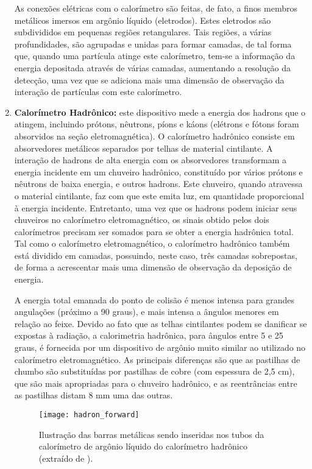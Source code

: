 \begin{enumerate}
As conexões elétricas com o calorímetro são feitas, de fato, a finos membros metálicos imersos em argônio líquido (eletrodos). Estes eletrodos são subdivididos em pequenas regiões retangulares. Tais regiões, a várias profundidades, são agrupadas e unidas para formar camadas, de tal forma que, quando uma partícula atinge este calorímetro, tem-se a informação da energia depositada através de várias camadas, aumentando a resolução da detecção, uma vez que se adiciona mais uma dimensão de observação da interação de partículas com este calorímetro.

\item \textbf{Calorímetro Hadrônico:} este dispositivo mede a energia dos hadrons que o atingem, incluindo prótons, nêutrons, píons e káons (elétrons e fótons foram absorvidos na seção eletromagnética). O calorímetro hadrônico consiste em absorvedores metálicos separados por telhas de material cintilante. A interação de hadrons de alta energia com os absorvedores transformam a energia incidente em um chuveiro hadrônico, constituído por vários prótons e nêutrons de baixa energia, e outros hadrons. Este chuveiro, quando atravessa o material cintilante, faz com que este emita luz, em quantidade proporcional à energia incidente. Entretanto, uma vez que os hadrons podem iniciar seus chuveiros no calorímetro eletromagnético, os sinais obtido pelos dois calorímetros precisam ser somados para se obter a energia hadrônica total. Tal como o calorímetro eletromagnético, o calorímetro hadrônico também está dividido em camadas, possuindo, neste caso, três camadas sobrepostas, de forma a acrescentar mais uma dimensão de observação da deposição de energia.

A energia total emanada do ponto de colisão é menos intensa para grandes angulações (próximo a 90 graus), e mais intensa a ângulos menores em relação ao feixe. Devido ao fato que as telhas cintilantes podem se danificar se expostas à radiação, a calorimetria hadrônica, para ângulos entre 5 e 25 graus, é fornecida por um dispositivo de argônio muito similar ao utilizado no calorímetro eletromagnético. As principais diferenças são que as pastilhas de chumbo são substituídas por pastilhas de cobre (com espessura de 2,5 cm), que são mais apropriadas para o chuveiro hadrônico, e as reentrâncias entre as pastilhas distam 8 mm uma das outras.

\begin{figure}
\begin{center}
\texttt{[image: hadron\_forward]}
\caption[Ilustração das barras metálicas sendo inseridas nos tubos da calorímetro de argônio líquido do calorímetro hadrônico.]{Ilustração das barras metálicas sendo inseridas nos tubos da calorímetro de argônio líquido do calorímetro hadrônico (extraído de \cite{bib:site_atlas}).}
\label{FIG:BARRAS_CALORIMETRO_HADRONICO}
\end{center}
\end{figure}


\end{enumerate}
